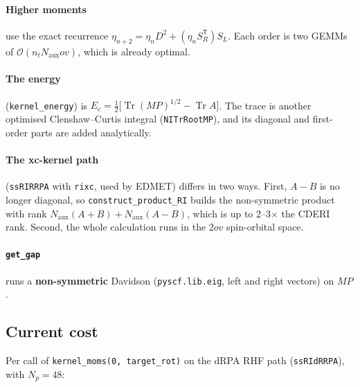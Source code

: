 \documentclass[11pt,a4paper]{article}
\newcommand{\code}[1]{\texttt{\small #1}}
\newcommand{\Naux}{N_{\mathrm{aux}}}
\newcommand{\nt}{n_{t}}
\newcommand{\Np}{N_{p}}
\newcommand{\ov}{ov}
\newcommand{\Tr}{\operatorname{Tr}}
\begin{document}
\paragraph{Higher moments} use the exact recurrence
$\eta_{n+2} = \eta_n D^2 + (\eta_n S_R^{\mathsf T})S_L$. Each order is two GEMMs of
$\mathcal{O}(\nt\Naux\ov)$, which is already optimal.

\paragraph{The energy} (\code{kernel\_energy}) is
$E_c = \tfrac12\big[\Tr(MP)^{1/2} - \Tr A\big]$. The trace is another optimised
Clenshaw--Curtis integral (\code{NITrRootMP}), and its diagonal and first-order parts are
added analytically.

\paragraph{The xc-kernel path} (\code{ssRIRRPA} with \code{rixc}, used by EDMET) differs in
two ways. First, $A-B$ is no longer diagonal, so \code{construct\_product\_RI} builds the
non-symmetric product with rank $\Naux(A{+}B)+\Naux(A{-}B)$, which is up to 2--3$\times$ the
CDERI rank. Second, the whole calculation runs in the $2\ov$ spin-orbital space.

\paragraph{\code{get\_gap}} runs a \textbf{non-symmetric} Davidson
(\code{pyscf.lib.eig}, left and right vectors) on $MP$.

\subsection{Current cost}

Per call of \code{kernel\_moms(0, target\_rot)} on the dRPA RHF path (\code{ssRIdRRPA}),
with $\Np=48$:
\end{document}
